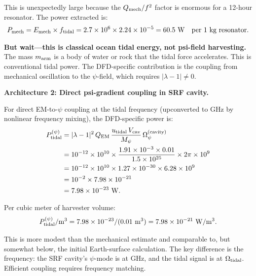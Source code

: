 \documentclass[aps,prd,twocolumn,superscriptaddress]{revtex4-2}
\newcommand{\Mpsi}{M_\psi}
\newcommand{\Opsi}{\Omega_\psi}
\newcommand{\lam}{|\lambda-1|}
\begin{document}
This is unexpectedly large because the $Q_{\rm mech}/f^2$ factor is
enormous for a 12-hour resonator.  The power extracted is:
\begin{equation}
P_{\rm mech} = E_{\rm mech}\times f_{\rm tidal} = 2.7\times 10^6\times 2.24\times 10^{-5}
= 60.5~\mathrm{W}\quad\text{per 1~kg resonator}.
\end{equation}

\textbf{But wait---this is classical ocean tidal energy, not psi-field
harvesting.}  The mass $m_{\rm arm}$ is a body of water or rock that
the tidal force accelerates.  This is conventional tidal power.  The
DFD-specific contribution is the coupling from mechanical oscillation
to the $\psi$-field, which requires $\lam \neq 0$.

\textbf{Architecture 2: Direct psi-gradient coupling in SRF cavity.}

For direct EM-to-$\psi$ coupling at the tidal frequency (upconverted
to GHz by nonlinear frequency mixing), the DFD-specific power is:
\begin{align}
P_{\rm tidal}^{(\psi)} &= \lam^2\,Q_{\rm EM}\,
\frac{u_{\rm tidal}\,V_{\rm cav}}{\Mpsi}\,\Opsi^{(\rm cavity)} \notag\\
&= 10^{-12}\times 10^{10}
\times\frac{1.91\times 10^{-3}\times 0.01}{1.5\times 10^{25}}
\times 2\pi\times 10^9 \notag\\
&= 10^{-12}\times 10^{10}
\times 1.27\times 10^{-30}
\times 6.28\times 10^9 \notag\\
&= 10^{-2}\times 7.98\times 10^{-21} \notag\\
&= 7.98\times 10^{-23}~\mathrm{W}.
\end{align}

Per cubic meter of harvester volume:
\begin{equation}
P_{\rm tidal}^{(\psi)}/\mathrm{m^3}
= 7.98\times 10^{-23}/(0.01~\mathrm{m^3}) = 7.98\times 10^{-21}~\mathrm{W/m^3}.
\end{equation}

This is more modest than the mechanical estimate and comparable to,
but somewhat below, the initial Earth-surface calculation.  The key
difference is the frequency: the SRF cavity's $\psi$-mode is at GHz,
and the tidal signal is at $\Omega_{\rm tidal}$.  Efficient coupling
requires frequency matching.
\end{document}
